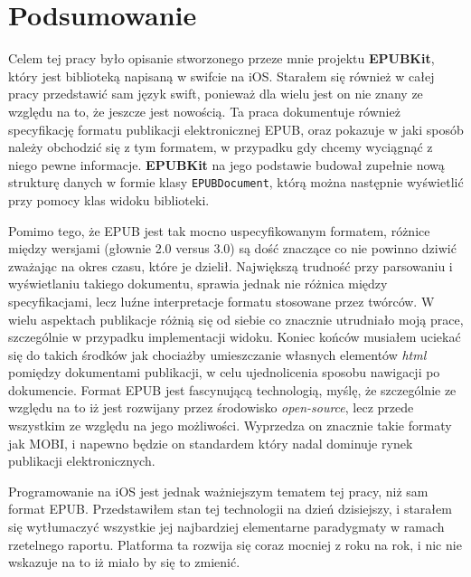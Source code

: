 \chapter{Podsumowanie}

Celem tej pracy było opisanie stworzonego przeze mnie projektu \textbf{EPUBKit}, który jest biblioteką napisaną w swifcie na iOS. Starałem się również w całej pracy przedstawić sam język swift, ponieważ dla wielu jest on nie znany ze względu na to, że jeszcze jest nowością. Ta praca dokumentuje również specyfikację formatu publikacji elektronicznej EPUB, oraz pokazuje w jaki sposób należy obchodzić się z tym formatem, w przypadku gdy chcemy wyciągnąć z niego pewne informacje. \textbf{EPUBKit} na jego podstawie budował zupełnie nową strukturę danych w formie klasy \texttt{EPUBDocument}, którą można następnie wyświetlić przy pomocy klas widoku biblioteki.

Pomimo tego, że EPUB jest tak mocno uspecyfikowanym formatem, różnice między wersjami (głownie 2.0 versus 3.0) są dość znaczące co nie powinno dziwić zważając na okres czasu, które je dzielił. Największą trudność przy parsowaniu i wyświetlaniu takiego dokumentu, sprawia jednak nie różnica między specyfikacjami, lecz luźne interpretacje formatu stosowane przez twórców. W wielu aspektach publikacje różnią się od siebie co znacznie utrudniało moją prace, szczególnie w przypadku implementacji widoku. Koniec końców musiałem uciekać się do takich środków jak chociażby umieszczanie własnych elementów \textit{html} pomiędzy dokumentami publikacji, w celu ujednolicenia sposobu nawigacji po dokumencie. Format EPUB jest fascynującą technologią, myślę, że szczególnie ze względu na to iż jest rozwijany przez środowisko \textit{open-source}, lecz przede wszystkim ze względu na jego możliwości. Wyprzedza on znacznie takie formaty jak MOBI, i napewno będzie on standardem który nadal dominuje rynek publikacji elektronicznych.

Programowanie na iOS jest jednak ważniejszym tematem tej pracy, niż sam format EPUB. Przedstawiłem stan tej technologii na dzień dzisiejszy, i starałem się wytłumaczyć wszystkie jej najbardziej elementarne paradygmaty w ramach rzetelnego raportu. Platforma ta rozwija się coraz mocniej z roku na rok, i nic nie wskazuje na to iż miało by się to zmienić.
